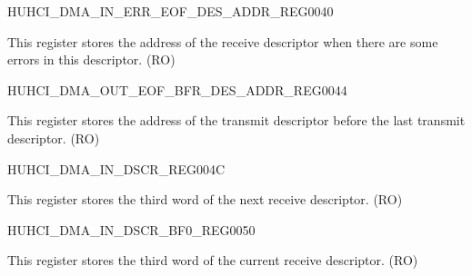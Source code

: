 \begin{register}{H}{UHCI\_DMA\_IN\_ERR\_EOF\_DES\_ADDR\_REG}{\hexprefix{}0040}\label{regdesc:UHCIDMAINERREOFDESADDRREG}
%
\regnewline%
\begin{regdesc}\begin{reglist}
\label{fielddesc:UHCIINERREOFDESADDR}\item [UHCI\_IN\_ERR\_EOF\_DES\_ADDR] This register stores the address of the receive descriptor when there are some errors in this descriptor. (RO)
\end{reglist}\end{regdesc}
\end{register}


\begin{register}{H}{UHCI\_DMA\_OUT\_EOF\_BFR\_DES\_ADDR\_REG}{\hexprefix{}0044}\label{regdesc:UHCIDMAOUTEOFBFRDESADDRREG}
%
\regnewline%
\begin{regdesc}\begin{reglist}
\label{fielddesc:UHCIOUTEOFBFRDESADDR}\item [UHCI\_OUT\_EOF\_BFR\_DES\_ADDR] This register stores the address of the transmit descriptor before the last transmit descriptor. (RO)
\end{reglist}\end{regdesc}
\end{register}


\begin{register}{H}{UHCI\_DMA\_IN\_DSCR\_REG}{\hexprefix{}004C}\label{regdesc:UHCIDMAINDSCRREG}
%
\regnewline%
\begin{regdesc}\begin{reglist}
\label{fielddesc:UHCIINLINKDSCR}\item [UHCI\_INLINK\_DSCR] This register stores the third word of the next receive descriptor. (RO)
\end{reglist}\end{regdesc}
\end{register}


\begin{register}{H}{UHCI\_DMA\_IN\_DSCR\_BF0\_REG}{\hexprefix{}0050}\label{regdesc:UHCIDMAINDSCRBF0REG}
%
\regnewline%
\begin{regdesc}\begin{reglist}
\label{fielddesc:UHCIINLINKDSCRBF0}\item [UHCI\_INLINK\_DSCR\_BF0] This register stores the third word of the current receive descriptor. (RO)
\end{reglist}\end{regdesc}
\end{register}


